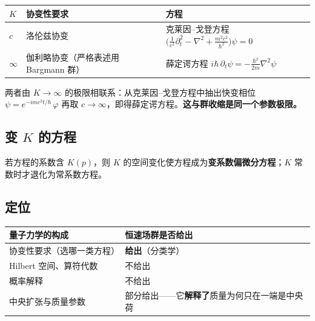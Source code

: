 \documentclass[
  chinese,
  a4paper,
  UTF8,
  12pt,
  oneside,
  openany]{ctexbook}
\newcounter{none} %
\theoremstyle{plain}
\theoremstyle{plain}
\theoremstyle{plain}
\theoremstyle{definition}
\theoremstyle{plain}
\theoremstyle{plain}
\theoremstyle{remark}
\begin{document}
{\def\LTcaptype{none} %
\begin{longtable}[]{@{}
  >{\raggedright\arraybackslash}p{}
  >{\raggedright\arraybackslash}p{}
  >{\raggedright\arraybackslash}p{}@{}}
\toprule\noalign{}
\begin{minipage}[b]{\linewidth}\raggedright
\(K\)
\end{minipage} & \begin{minipage}[b]{\linewidth}\raggedright
协变性要求
\end{minipage} & \begin{minipage}[b]{\linewidth}\raggedright
方程
\end{minipage} \\
\midrule\noalign{}
\endhead
\bottomrule\noalign{}
\endlastfoot
\(c\) & 洛伦兹协变 & 克莱因--戈登方程
\(\bigl(\frac{1}{c^{2}}\partial_t^{2}-\nabla^{2}+\frac{m^{2}c^{2}}{\hbar^{2}}\bigr)\psi=0\) \\
\(\infty\) & 伽利略协变（严格表述用 Bargmann 群） & 薛定谔方程
\(i\hbar\,\partial_t\psi=-\frac{\hbar^{2}}{2m}\nabla^{2}\psi\) \\
\end{longtable}
}

两者由 \(K\to\infty\) 的极限相联系：从克莱因--戈登方程中抽出快变相位
\(\psi=e^{-imc^{2}t/\hbar}\,\varphi\) 再取
\(c\to\infty\)，即得薛定谔方程。\textbf{这与群收缩是同一个参数极限。}

\subsection{\texorpdfstring{变 \(K\)
的方程}{变 K 的方程}}\label{ux53d8-k-ux7684ux65b9ux7a0b}

若方程的系数含 \(K(p)\)，则 \(K\)
的空间变化使方程成为\textbf{变系数偏微分方程}；\(K\)
常数时才退化为常系数方程。

\subsection{定位}\label{ux5b9aux4f4d-1}

{\def\LTcaptype{none} %
\begin{longtable}[]{@{}ll@{}}
\toprule\noalign{}
量子力学的构成 & 恒速场群是否给出 \\
\midrule\noalign{}
\endhead
\bottomrule\noalign{}
\endlastfoot
协变性要求（选哪一类方程） & \textbf{给出}（分类学） \\
Hilbert 空间、算符代数 & 不给出 \\
概率解释 & 不给出 \\
中央扩张与质量参数 &
部分给出------它\textbf{解释了}质量为何只在一端是中央荷 \\
\end{longtable}
}
\end{document}
